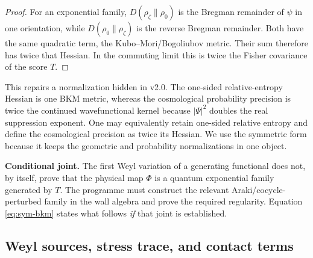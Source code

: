 \documentclass[11pt]{article}
\numberwithin{equation}{section}
\theoremstyle{definition}
\theoremstyle{remark}
\begin{document}
\begin{proof}
For an exponential family, $D(\rho_\zeta\|\rho_0)$ is the Bregman remainder of $\psi$ in one orientation, while $D(\rho_0\|\rho_\zeta)$ is the reverse Bregman remainder. Both have the same quadratic term, the Kubo--Mori/Bogoliubov metric. Their sum therefore has twice that Hessian. In the commuting limit this is twice the Fisher covariance of the score $T$.
\end{proof}

This repairs a normalization hidden in v2.0. The one-sided relative-entropy Hessian is one BKM metric, whereas the cosmological probability precision is twice the continued wavefunctional kernel because $|\Psi|^2$ doubles the real suppression exponent. One may equivalently retain one-sided relative entropy and define the cosmological precision as twice its Hessian. We use the symmetric form because it keeps the geometric and probability normalizations in one object.

\begin{warningbox}
\textbf{Conditional joint.} The first Weyl variation of a generating functional does not, by itself, prove that the physical map $\Phi$ is a quantum exponential family generated by $T$. The programme must construct the relevant Araki/cocycle-perturbed family in the wall algebra and prove the required regularity. Equation \eqref{eq:sym-bkm} states what follows \emph{if} that joint is established.
\end{warningbox}

\subsection{Weyl sources, stress trace, and contact terms}
\end{document}
